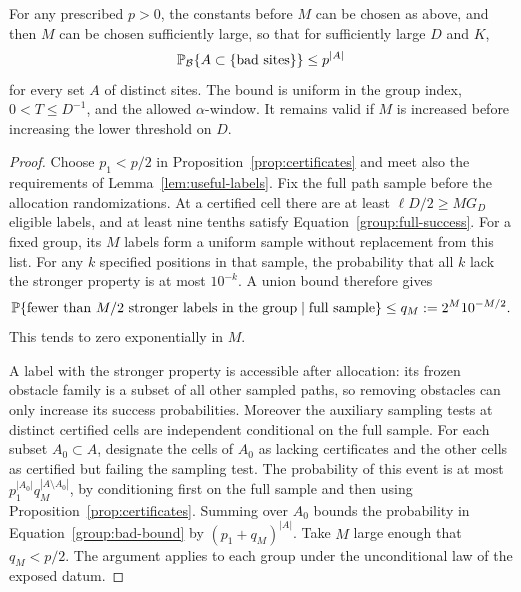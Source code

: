 \begin{proposition}\label{prop:group-supply}
For any prescribed $p>0$, the constants before $M$ can be chosen as
above, and then $M$ can be chosen sufficiently large, so that for
sufficiently large $D$ and $K$,
\begin{equation}\label{group:bad-bound}
 \mathbb P_{\mathcal B}\{A\subset\{\text{bad sites}\}\}\le p^{|A|}
\end{equation}
for every set $A$ of distinct sites.  The bound is uniform in the
group index, $0<T\le D^{-1}$, and the allowed $\alpha$-window.
It remains valid if $M$ is increased before increasing the lower
threshold on $D$.
\end{proposition}

\begin{proof}
Choose $p_1<p/2$ in Proposition~\ref{prop:certificates} and meet also
the requirements of Lemma~\ref{lem:useful-labels}.  Fix the
full path sample before the allocation randomizations.  At a certified
cell there are at least $\ell D/2\ge MG_D$ eligible labels, and
at least nine tenths satisfy Equation~\eqref{group:full-success}.
For a fixed group, its $M$ labels form a uniform sample without
replacement from this list.  For any $k$ specified positions in that
sample, the probability that all $k$ lack the stronger property is
at most $10^{-k}$.  A union bound therefore gives
\begin{equation}\label{group:sampling-failure}
 \mathbb P\{\text{fewer than $M/2$ stronger labels in the group}
            \mid\text{full sample}\}
 \le q_M:=2^M10^{-M/2}.
\end{equation}
This tends to zero exponentially in $M$.

A label with the stronger property is accessible after allocation:
its frozen obstacle family is a subset of all other sampled paths,
so removing obstacles can only increase its success probabilities.
Moreover the auxiliary sampling tests at distinct certified cells
are independent conditional on the full sample.  For each subset
$A_0\subset A$, designate the cells of $A_0$ as lacking certificates
and the other cells as certified but failing the sampling test.
The probability of this event is at most
$p_1^{|A_0|}q_M^{|A\setminus A_0|}$, by conditioning first on the
full sample and then using Proposition~\ref{prop:certificates}.
Summing over $A_0$ bounds the probability in
Equation~\eqref{group:bad-bound} by $(p_1+q_M)^{|A|}$.
Take $M$ large enough that $q_M<p/2$.  The argument applies to each
group under the unconditional law of the exposed datum.
\end{proof}

